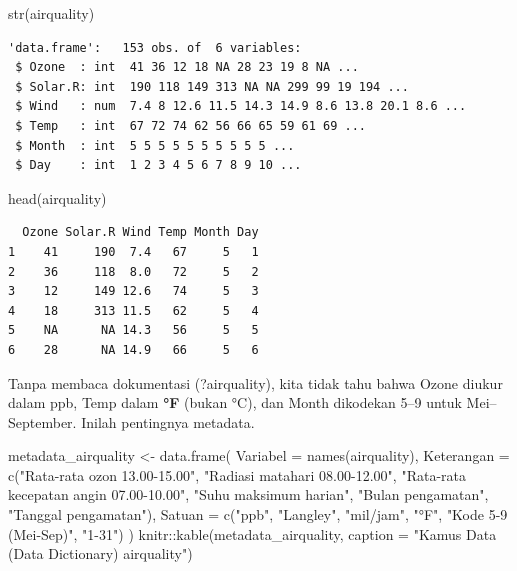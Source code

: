 \documentclass[
  indonesian,
  letterpaper,
]{book}
\newenvironment{Shaded}{\begin{snugshade}}{\end{snugshade}}
\newcommand{\AttributeTok}[1]{\textcolor[rgb]{0.40,0.45,0.13}{#1}}
\newcommand{\FunctionTok}[1]{\textcolor[rgb]{0.28,0.35,0.67}{#1}}
\newcommand{\NormalTok}[1]{\textcolor[rgb]{0.00,0.23,0.31}{#1}}
\newcommand{\OtherTok}[1]{\textcolor[rgb]{0.00,0.23,0.31}{#1}}
\newcommand{\SpecialCharTok}[1]{\textcolor[rgb]{0.37,0.37,0.37}{#1}}
\newcommand{\StringTok}[1]{\textcolor[rgb]{0.13,0.47,0.30}{#1}}
\begin{document}
\begin{Shaded}
\begin{Highlighting}[]
\FunctionTok{str}\NormalTok{(airquality)}
\end{Highlighting}
\end{Shaded}

\begin{verbatim}
'data.frame':   153 obs. of  6 variables:
 $ Ozone  : int  41 36 12 18 NA 28 23 19 8 NA ...
 $ Solar.R: int  190 118 149 313 NA NA 299 99 19 194 ...
 $ Wind   : num  7.4 8 12.6 11.5 14.3 14.9 8.6 13.8 20.1 8.6 ...
 $ Temp   : int  67 72 74 62 56 66 65 59 61 69 ...
 $ Month  : int  5 5 5 5 5 5 5 5 5 5 ...
 $ Day    : int  1 2 3 4 5 6 7 8 9 10 ...
\end{verbatim}

\begin{Shaded}
\begin{Highlighting}[]
\FunctionTok{head}\NormalTok{(airquality)}
\end{Highlighting}
\end{Shaded}

\begin{verbatim}
  Ozone Solar.R Wind Temp Month Day
1    41     190  7.4   67     5   1
2    36     118  8.0   72     5   2
3    12     149 12.6   74     5   3
4    18     313 11.5   62     5   4
5    NA      NA 14.3   56     5   5
6    28      NA 14.9   66     5   6
\end{verbatim}

Tanpa membaca dokumentasi (?airquality), kita tidak tahu bahwa Ozone
diukur dalam ppb, Temp dalam \textbf{°F} (bukan °C), dan Month dikodekan
5--9 untuk Mei--September. Inilah pentingnya metadata.

\begin{Shaded}
\begin{Highlighting}[]
\NormalTok{metadata\_airquality }\OtherTok{\textless{}{-}} \FunctionTok{data.frame}\NormalTok{(}
\AttributeTok{Variabel =} \FunctionTok{names}\NormalTok{(airquality),}
\AttributeTok{Keterangan =} \FunctionTok{c}\NormalTok{(}\StringTok{"Rata{-}rata ozon 13.00{-}15.00"}\NormalTok{, }\StringTok{"Radiasi matahari 08.00{-}12.00"}\NormalTok{,}
\StringTok{"Rata{-}rata kecepatan angin 07.00{-}10.00"}\NormalTok{, }\StringTok{"Suhu maksimum harian"}\NormalTok{,}
\StringTok{"Bulan pengamatan"}\NormalTok{, }\StringTok{"Tanggal pengamatan"}\NormalTok{), }\AttributeTok{Satuan =} \FunctionTok{c}\NormalTok{(}\StringTok{"ppb"}\NormalTok{, }\StringTok{"Langley"}\NormalTok{, }\StringTok{"mil/jam"}\NormalTok{, }\StringTok{"°F"}\NormalTok{, }\StringTok{"Kode 5{-}9 (Mei{-}Sep)"}\NormalTok{, }\StringTok{"1{-}31"}\NormalTok{)}
\NormalTok{)}
\NormalTok{knitr}\SpecialCharTok{::}\FunctionTok{kable}\NormalTok{(metadata\_airquality, }\AttributeTok{caption =} \StringTok{"Kamus Data (Data Dictionary) airquality"}\NormalTok{)}
\end{Highlighting}
\end{Shaded}
\end{document}
